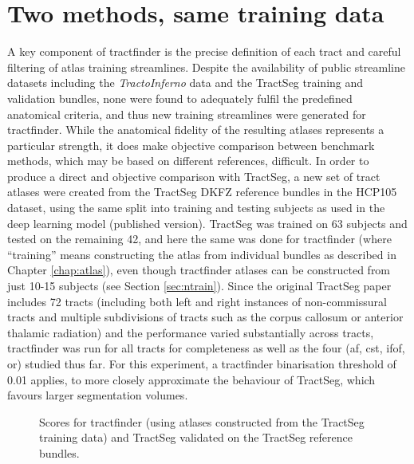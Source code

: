 \section{Two methods, same training data}\label{sec:tractseg}

A key component of tractfinder is the precise definition of each tract and careful filtering of atlas training streamlines.
Despite the availability of public streamline datasets including the \textit{TractoInferno} data and the TractSeg training and validation bundles, none were found to adequately fulfil the predefined anatomical criteria, and thus new training streamlines were generated for tractfinder.
While the anatomical fidelity of the resulting atlases represents a particular strength, it does make objective comparison between benchmark methods, which may be based on different references, difficult.
In order to produce a direct and objective comparison with TractSeg, a new set of tract atlases were created from the TractSeg DKFZ reference bundles\autocite{Wasserthal2018b} in the HCP105 dataset, using the same split into training and testing subjects as used in the deep learning model (published version).
TractSeg was trained on 63 subjects and tested on the remaining 42, and here the same was done for tractfinder (where ``training'' means constructing the atlas from individual bundles as described in Chapter \ref{chap:atlas}), even though tractfinder atlases can be constructed from just 10-15 subjects (see Section \ref{sec:ntrain}).
Since the original TractSeg paper includes 72 tracts (including both left and right instances of non-commissural tracts and multiple subdivisions of tracts such as the corpus callosum or anterior thalamic radiation) and the performance varied substantially across tracts, tractfinder was run for all tracts for completeness as well as the four (\gls{af}, \gls{cst}, \gls{ifof}, \gls{or}) studied thus far.
For this experiment, a tractfinder binarisation threshold of 0.01 applies, to more closely approximate the behaviour of TractSeg, which favours larger segmentation volumes.

\begin{figure}[htb!]
  \caption[Direct comparison between tractfinder and TractSeg, all metrics]{Scores for tractfinder (using atlases constructed from the TractSeg training data) and TractSeg validated on the TractSeg reference bundles.}
  \label{fig:ts_atlas}
\end{figure}

